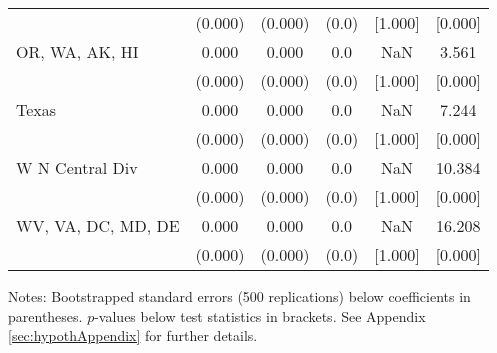 \begin{landscape}
\begin{table}[ht]
{\begin{threeparttable}
\begin{tabular}{lccccc}
 & (0.000) & (0.000) & (0.0) & [1.000] & [0.000] \\ 
OR, WA, AK, HI & 0.000 & 0.000 & 0.0 & NaN & 3.561 \\ 
 & (0.000) & (0.000) & (0.0) & [1.000] & [0.000] \\ 
Texas & 0.000 & 0.000 & 0.0 & NaN & 7.244 \\ 
 & (0.000) & (0.000) & (0.0) & [1.000] & [0.000] \\ 
W N Central Div & 0.000 & 0.000 & 0.0 & NaN & 10.384 \\ 
 & (0.000) & (0.000) & (0.0) & [1.000] & [0.000] \\ 
WV, VA, DC, MD, DE & 0.000 & 0.000 & 0.0 & NaN & 16.208 \\ 
 & (0.000) & (0.000) & (0.0) & [1.000] & [0.000] \\ 
\bottomrule
\end{tabular}
{\footnotesize {\raggedright Notes: Bootstrapped standard errors (500 replications) below coefficients in parentheses. $p$-values below test statistics in brackets. See Appendix \ref{sec:hypothAppendix} for further details.}}
\end{threeparttable}
}
\end{table}
\end{landscape}
